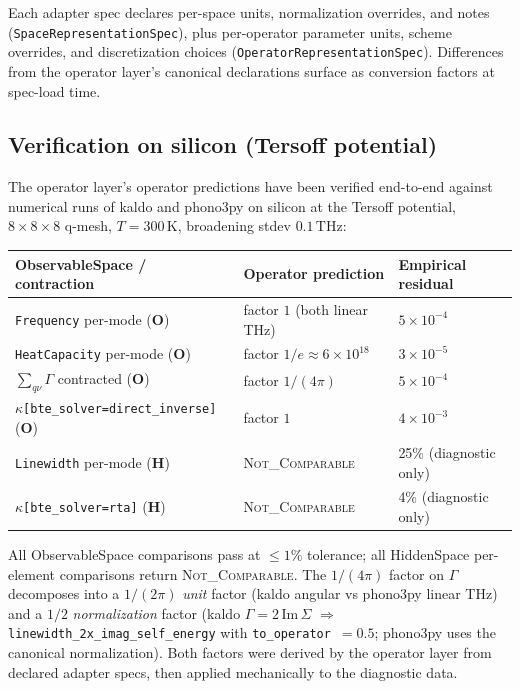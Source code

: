 \documentclass[11pt,a4paper]{article}
\begin{document}
Each adapter spec declares per-space units, normalization overrides, and notes
(\texttt{SpaceRepresentationSpec}), plus per-operator parameter units, scheme
overrides, and discretization choices (\texttt{OperatorRepresentationSpec}). Differences
from the operator layer's canonical declarations surface as conversion factors at
spec-load time.

\subsection{Verification on silicon (Tersoff potential)}
\label{ssec:silicon-verification}

The operator layer's operator predictions have been verified end-to-end against numerical
runs of kaldo and phono3py on silicon at the Tersoff potential, $8\times 8\times 8$
q-mesh, $T = 300\,\text{K}$, broadening stdev $0.1\,\text{THz}$:

\begin{center}
\begin{tabular}{lll}
\toprule
ObservableSpace / contraction & Operator prediction & Empirical residual \\
\midrule
\texttt{Frequency} per-mode (\textbf{O})            & factor $1$ (both linear THz)  & $5\times 10^{-4}$ \\
\texttt{HeatCapacity} per-mode (\textbf{O})         & factor $1/e \approx 6\times 10^{18}$ & $3\times 10^{-5}$ \\
$\sum_{q\nu}\Gamma$ contracted (\textbf{O})          & factor $1/(4\pi)$              & $5\times 10^{-4}$ \\
$\kappa$\texttt{[bte\_solver=direct\_inverse]} (\textbf{O}) & factor $1$                & $4\times 10^{-3}$ \\
\midrule
\texttt{Linewidth} per-mode (\textbf{H})            & \textsc{Not\_Comparable} & 25\% (diagnostic only) \\
$\kappa$\texttt{[bte\_solver=rta]} (\textbf{H})     & \textsc{Not\_Comparable} & 4\% (diagnostic only) \\
\bottomrule
\end{tabular}
\end{center}

All ObservableSpace comparisons pass at $\le 1\%$ tolerance; all HiddenSpace per-element
comparisons return \textsc{Not\_Comparable}. The $1/(4\pi)$ factor on $\Gamma$
decomposes into a $1/(2\pi)$ \emph{unit} factor (kaldo angular vs phono3py linear
THz) and a $1/2$ \emph{normalization} factor (kaldo $\Gamma = 2\,\text{Im}\,\Sigma$
$\Rightarrow$ \texttt{linewidth\_2x\_imag\_self\_energy} with
\texttt{to\_operator}~$=0.5$; phono3py uses the canonical normalization). Both
factors were derived by the operator layer from declared adapter specs, then
applied mechanically to the diagnostic data.
\end{document}
